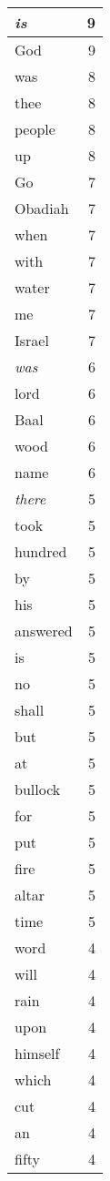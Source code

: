 \begin{center}
\begin{longtable}{l|r}
\emph{is} & 9\\ \hline 
God & 9\\ \hline 
was & 8\\ \hline 
thee & 8\\ \hline 
people & 8\\ \hline 
up & 8\\ \hline 
Go & 7\\ \hline 
Obadiah & 7\\ \hline 
when & 7\\ \hline 
with & 7\\ \hline 
water & 7\\ \hline 
me & 7\\ \hline 
Israel & 7\\ \hline 
\emph{was} & 6\\ \hline 
lord & 6\\ \hline 
Baal & 6\\ \hline 
wood & 6\\ \hline 
name & 6\\ \hline 
\emph{there} & 5\\ \hline 
took & 5\\ \hline 
hundred & 5\\ \hline 
by & 5\\ \hline 
his & 5\\ \hline 
answered & 5\\ \hline 
is & 5\\ \hline 
no & 5\\ \hline 
shall & 5\\ \hline 
but & 5\\ \hline 
at & 5\\ \hline 
bullock & 5\\ \hline 
for & 5\\ \hline 
put & 5\\ \hline 
fire & 5\\ \hline 
altar & 5\\ \hline 
time & 5\\ \hline 
word & 4\\ \hline 
will & 4\\ \hline 
rain & 4\\ \hline 
upon & 4\\ \hline 
himself & 4\\ \hline 
which & 4\\ \hline 
cut & 4\\ \hline 
an & 4\\ \hline 
fifty & 4\\ \hline 

\end{longtable}
\end{center}
